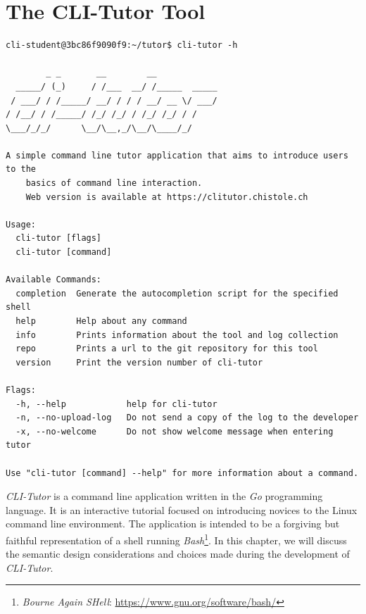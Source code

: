 \chapter{The CLI-Tutor Tool}
%
\label{chap:clitutor}

\begin{lstlisting}[float=htbp, keepspaces, frame=single, language={}, label=lst:clihelp, caption=Output of the help flag of \textit{CLI-Tutor} running in a docker container.]
cli-student@3bc86f9090f9:~/tutor$ cli-tutor -h

        _ _       __        __
  _____/ (_)     / /___  __/ /_____  _____
 / ___/ / /_____/ __/ / / / __/ __ \/ ___/
/ /__/ / /_____/ /_/ /_/ / /_/ /_/ / /
\___/_/_/      \__/\__,_/\__/\____/_/

A simple command line tutor application that aims to introduce users to the
    basics of command line interaction.
    Web version is available at https://clitutor.chistole.ch

Usage:
  cli-tutor [flags]
  cli-tutor [command]

Available Commands:
  completion  Generate the autocompletion script for the specified shell
  help        Help about any command
  info        Prints information about the tool and log collection
  repo        Prints a url to the git repository for this tool
  version     Print the version number of cli-tutor

Flags:
  -h, --help            help for cli-tutor
  -n, --no-upload-log   Do not send a copy of the log to the developer
  -x, --no-welcome      Do not show welcome message when entering tutor

Use "cli-tutor [command] --help" for more information about a command.
\end{lstlisting}

\textit{CLI-Tutor} is a command line application written in the \textit{Go}
programming language. It is an interactive tutorial focused on introducing
novices to the Linux command line environment. The application is intended to
be a forgiving but faithful representation of a shell running
\textit{Bash}\footnote{\textit{Bourne Again SHell}:
\url{https://www.gnu.org/software/bash/}}. In this chapter, we will discuss the
semantic design considerations and choices made during the development of
\textit{CLI-Tutor}.

